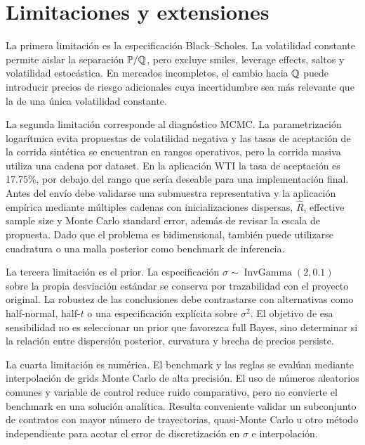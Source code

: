 \section{Limitaciones y extensiones}

La primera limitación es la especificación Black--Scholes. La volatilidad constante permite aislar la separación $\mathbb{P}/\mathbb{Q}$, pero excluye smiles, leverage effects, saltos y volatilidad estocástica. En mercados incompletos, el cambio hacia $\mathbb{Q}$ puede introducir precios de riesgo adicionales cuya incertidumbre sea más relevante que la de una única volatilidad constante.

La segunda limitación corresponde al diagnóstico MCMC. La parametrización logarítmica evita propuestas de volatilidad negativa y las tasas de aceptación de la corrida sintética se encuentran en rangos operativos, pero la corrida masiva utiliza una cadena por dataset. En la aplicación WTI la tasa de aceptación es 17.75\%, por debajo del rango que sería deseable para una implementación final. Antes del envío debe validarse una submuestra representativa y la aplicación empírica mediante múltiples cadenas con inicializaciones dispersas, $\widehat R$, effective sample size y Monte Carlo standard error, además de revisar la escala de propuesta. Dado que el problema es bidimensional, también puede utilizarse cuadratura o una malla posterior como benchmark de inferencia.

La tercera limitación es el prior. La especificación $\sigma\sim\operatorname{InvGamma}(2,0.1)$ sobre la propia desviación estándar se conserva por trazabilidad con el proyecto original. La robustez de las conclusiones debe contrastarse con alternativas como half-normal, half-$t$ o una especificación explícita sobre $\sigma^2$. El objetivo de esa sensibilidad no es seleccionar un prior que favorezca full Bayes, sino determinar si la relación entre dispersión posterior, curvatura y brecha de precios persiste.

La cuarta limitación es numérica. El benchmark y las reglas se evalúan mediante interpolación de grids Monte Carlo de alta precisión. El uso de números aleatorios comunes y variable de control reduce ruido comparativo, pero no convierte el benchmark en una solución analítica. Resulta conveniente validar un subconjunto de contratos con mayor número de trayectorias, quasi-Monte Carlo u otro método independiente para acotar el error de discretización en $\sigma$ e interpolación.

